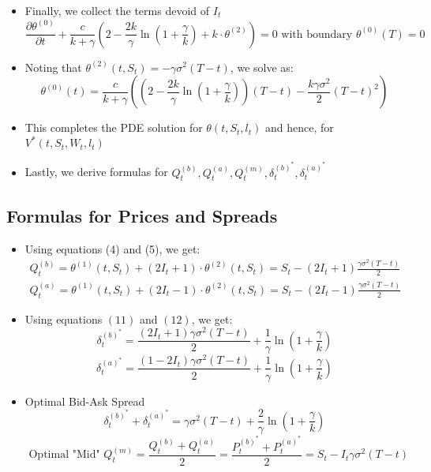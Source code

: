\documentclass[10pt]{article}
\begin{document}
\begin{itemize} 
    \item Finally, we collect the terms devoid of $I_{t}$
    $$
    \frac{\partial \theta^{(0)}}{\partial t}+\frac{c}{k+\gamma}\left(2-\frac{2 k}{\gamma} \ln \left(1+\frac{\gamma}{k}\right)+k \cdot \theta^{(2)}\right)=0 \text { with boundary } \theta^{(0)}(T)=0
    $$
    \item Noting that $\theta^{(2)}\left(t, S_{t}\right)=-\gamma \sigma^{2}(T-t)$, we solve as:
    \[
    \theta^{(0)}(t)=\frac{c}{k+\gamma}\left(\left(2-\frac{2 k}{\gamma} \ln \left(1+\frac{\gamma}{k}\right)\right)(T-t)-\frac{k \gamma \sigma^{2}}{2}(T-t)^{2}\right) \tag{20}
    \]
    \item This completes the PDE solution for $\theta\left(t, S_{t}, l_{t}\right)$ and hence, for $V^{*}\left(t, S_{t}, W_{t}, l_{t}\right)$
    \item Lastly, we derive formulas for $Q_{t}^{(b)}, Q_{t}^{(a)}, Q_{t}^{(m)}, \delta_{t}^{(b)^{*}}, \delta_{t}^{(a)^{*}}$
\end{itemize}

\subsection{Formulas for Prices and Spreads}

\begin{itemize} 
    \item Using equations (4) and (5), we get:
    \[
    \begin{array}{l}
    Q_{t}^{(b)}=\theta^{(1)}\left(t, S_{t}\right)+\left(2 I_{t}+1\right) \cdot \theta^{(2)}\left(t, S_{t}\right)=S_{t}-\left(2 I_{t}+1\right) \frac{\gamma \sigma^{2}(T-t)}{2} \tag{21,22} \\
    Q_{t}^{(a)}=\theta^{(1)}\left(t, S_{t}\right)+\left(2 I_{t}-1\right) \cdot \theta^{(2)}\left(t, S_{t}\right)=S_{t}-\left(2 I_{t}-1\right) \frac{\gamma \sigma^{2}(T-t)}{2}
    \end{array}
    \]
    \item Using equations $(11)$ and $(12)$, we get:
    \[
    \delta_{t}^{(b)^{*}}=\frac{\left(2 I_{t}+1\right) \gamma \sigma^{2}(T-t)}{2}+\frac{1}{\gamma} \ln \left(1+\frac{\gamma}{k}\right) \tag{23}
    \]
    \[
    \delta_{t}^{(a)^{*}}=\frac{\left(1-2 I_{t}\right) \gamma \sigma^{2}(T-t)}{2}+\frac{1}{\gamma} \ln \left(1+\frac{\gamma}{k}\right) \tag{24}
    \]
    \item Optimal Bid-Ask Spread \[\delta_{t}^{(b)^{*}}+\delta_{t}^{(a)^{*}}=\gamma \sigma^{2}(T-t)+\frac{2}{\gamma} \ln \left(1+\frac{\gamma}{k}\right) \tag{25} \]
    \[
    \text { Optimal "Mid" } Q_{t}^{(m)}=\frac{Q_{t}^{(b)}+Q_{t}^{(a)}}{2}=\frac{P_{t}^{(b)^{*}}+P_{t}^{(a)^{*}}}{2}=S_{t}-I_{t} \gamma \sigma^{2}(T-t) \tag{26}
    \]
\end{itemize}
\end{document}
